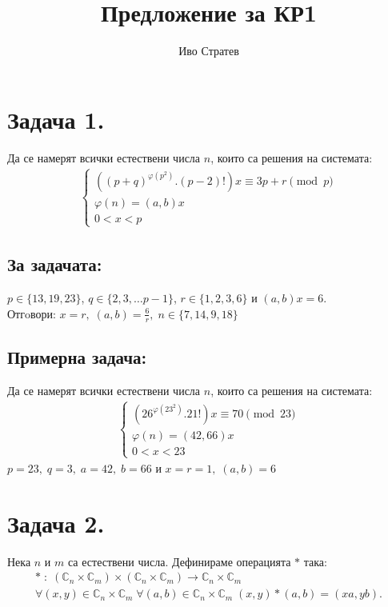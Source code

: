 \documentclass[a4paper, 12pt, oneside]{article}
\title{Предложение за КР1}
\author{Иво Стратев}
\begin{document}
\maketitle
\section*{Задача 1.}
Да се намерят всички естествени числа \(n\), които са решения на системата:
\begin{align*}
\begin{cases}
    \left(\displaystyle{(p + q)^{\varphi(p^2)}.(p - 2)!}\right)x \equiv 3p + r \pmod{p} \\
    \varphi(n) = (a, b)x \\
    0 < x < p
\end{cases}
\end{align*}
\subsection*{За задачата:}
\(p \in \{13, 19, 23\}\), \(q \in \{2, 3, \dots p - 1\}\), \(r \in \{1, 2, 3, 6\}\) и \((a, b)x = 6\). \\
Отгoвори: \(x = r, \; (a, b) = \displaystyle\frac{6}{r}, \; n \in \{7, 14, 9, 18\}\)
\subsection*{Примерна задача:}
Да се намерят всички естествени числа \(n\), които са решения на системата:
\begin{align*}
\begin{cases}
    \left(\displaystyle{26^{\varphi(23^2)}}.21!\right)x \equiv 70 \pmod{23} \\
    \varphi(n) = (42, 66)x \\
    0 < x < 23
\end{cases}
\end{align*}
\(p = 23, \; q = 3, \; a = 42, \; b = 66\) и \(x = r = 1, \; (a, b) = 6\)
\section*{Задача 2.}
Нека \(n\) и \(m\) са естествени числа. Дефинираме операцията \(*\) така:
\begin{align*}
    * \; : \; (\mathbb{C}_n \times \mathbb{C}_m) \times (\mathbb{C}_n \times \mathbb{C}_m) \to \mathbb{C}_n \times \mathbb{C}_m \\
    \forall (x, y) \in \mathbb{C}_n \times \mathbb{C}_m \; \forall (a, b) \in \mathbb{C}_n \times \mathbb{C}_m  \; (x, y) * (a, b) = (xa, yb). 
\end{align*}
\end{document}
